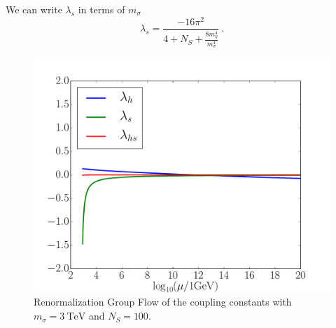 \documentclass[aps,prd,preprintnumbers,nofootinbibn,twocolumn]{revtex4}
\begin{document}
We can write $\lambda_s$ in terms of $m_\sigma$
\begin{equation}\label{eq:ls}
\lambda_s = \frac{-16\pi^2}{4+N_S+\frac{8m_\eta^4}{m_\sigma^4}}\ .
\end{equation}

\begin{figure}[t]
\centering
\includegraphics[width=\columnwidth]{scenario1}
\caption{Renormalization Group Flow of the coupling constants with $m_\sigma = \SI{3}{\tera\electronvolt}$ and $N_S=100$.}\label{fig:sce1}
\end{figure}
\end{document}
